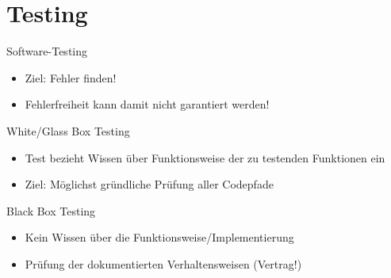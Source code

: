\section{Testing}

\begin{frame}{Software-Testing}
	\begin{itemize}
		\item Ziel: Fehler finden!
		\item Fehlerfreiheit kann damit nicht garantiert werden!
	\end{itemize}

	\begin{block}{White/Glass Box Testing}
		\begin{itemize}
			\item Test bezieht Wissen über Funktionsweise der zu testenden Funktionen ein
			\item Ziel: Möglichst gründliche Prüfung aller Codepfade
		\end{itemize}
	\end{block}
	
	\begin{block}{Black Box Testing}
		\begin{itemize}
			\item Kein Wissen über die Funktionsweise/Implementierung
			\item Prüfung der dokumentierten Verhaltensweisen (Vertrag!)
		\end{itemize}
	\end{block}
\end{frame}

